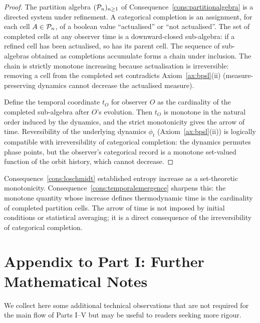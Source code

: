 \begin{proof}
The partition algebra $(\mathcal{P}_{n})_{n\geq 1}$ of Consequence~\ref{cons:partitionalgebra} is a directed system under refinement. A categorical completion is an assignment, for each cell $A\in\mathcal{P}_{n}$, of a boolean value ``actualised'' or ``not actualised''. The set of completed cells at any observer time is a downward-closed sub-algebra: if a refined cell has been actualised, so has its parent cell. The sequence of sub-algebras obtained as completions accumulate forms a chain under inclusion. The chain is strictly monotone increasing because actualisation is irreversible: removing a cell from the completed set contradicts Axiom~\ref{ax:bpsl}(ii) (measure-preserving dynamics cannot decrease the actualised measure).

Define the temporal coordinate $t_{O}$ for observer $O$ as the cardinality of the completed sub-algebra after $O$'s evolution. Then $t_{O}$ is monotone in the natural order induced by the dynamics, and the strict monotonicity gives the arrow of time. Reversibility of the underlying dynamics $\phi_{t}$ (Axiom~\ref{ax:bpsl}(ii)) is logically compatible with irreversibility of categorical completion: the dynamics permutes phase points, but the observer's categorical record is a monotone set-valued function of the orbit history, which cannot decrease.
\end{proof}

\begin{remark}
Consequence~\ref{cons:loschmidt} established entropy increase as a set-theoretic monotonicity. Consequence~\ref{cons:temporalemergence} sharpens this: the monotone quantity whose increase defines thermodynamic time is the cardinality of completed partition cells. The arrow of time is not imposed by initial conditions or statistical averaging; it is a direct consequence of the irreversibility of categorical completion.
\end{remark}

\section*{Appendix to Part I: Further Mathematical Notes}

We collect here some additional technical observations that are not required for the main flow of Parts I--V but may be useful to readers seeking more rigour.


